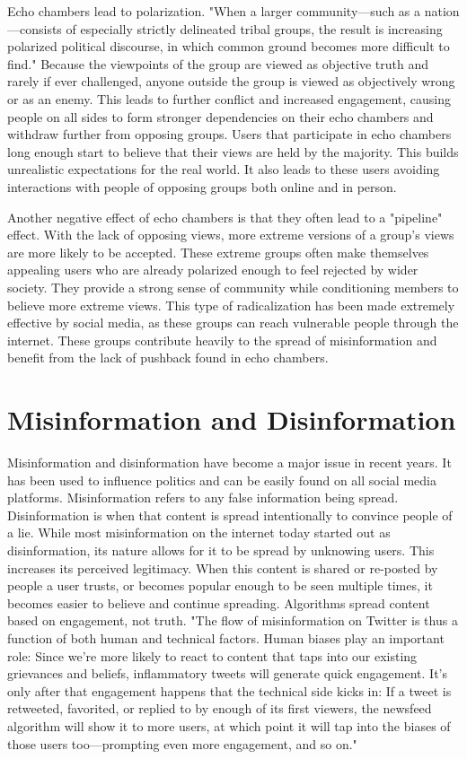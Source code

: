 \documentclass[conference]{IEEEtran}
\begin{document}
Echo chambers lead to polarization. "When a larger community—such as a nation—consists of especially strictly delineated tribal groups, the result is increasing polarized political discourse, in which common ground becomes more difficult to find."\cite{Ktepi2021_EchoChamber} Because the viewpoints of the group are viewed as objective truth and rarely if ever challenged, anyone outside the group is viewed as objectively wrong or as an enemy. This leads to further conflict and increased engagement, causing people on all sides to form stronger dependencies on their echo chambers and withdraw further from opposing groups. Users that participate in echo chambers long enough start to believe that their views are held by the majority. This builds unrealistic expectations for the real world. It also leads to these users avoiding interactions with people of opposing groups both online and in person.

Another negative effect of echo chambers is that they often lead to a "pipeline" effect. With the lack of opposing views, more extreme versions of a group's views are more likely to be accepted. These extreme groups often make themselves appealing users who are already polarized enough to feel rejected by wider society. They provide a strong sense of community while conditioning members to believe more extreme views. This type of radicalization has been made extremely effective by social media, as these groups can reach vulnerable people through the internet. These groups contribute heavily to the spread of misinformation and benefit from the lack of pushback found in echo chambers.

\section{Misinformation and Disinformation}
Misinformation and disinformation have become a major issue in recent years. It has been used to influence politics and can be easily found on all social media platforms. Misinformation refers to any false information being spread. Disinformation is when that content is spread intentionally to convince people of a lie. While most misinformation on the internet today started out as disinformation, its nature allows for it to be spread by unknowing users. This increases its perceived legitimacy. When this content is shared or re-posted by people a user trusts, or becomes popular enough to be seen multiple times, it becomes easier to believe and continue spreading. Algorithms spread content based on engagement, not truth. "The flow of misinformation on Twitter is thus a function of both human and technical factors. Human biases play an important role: Since we’re more likely to react to content that taps into our existing grievances and beliefs, inflammatory tweets will generate quick engagement. It’s only after that engagement happens that the technical side kicks in: If a tweet is retweeted, favorited, or replied to by enough of its first viewers, the newsfeed algorithm will show it to more users, at which point it will tap into the biases of those users too—prompting even more engagement, and so on."\cite{Meserole2018_MisinformationSpread}
\end{document}
